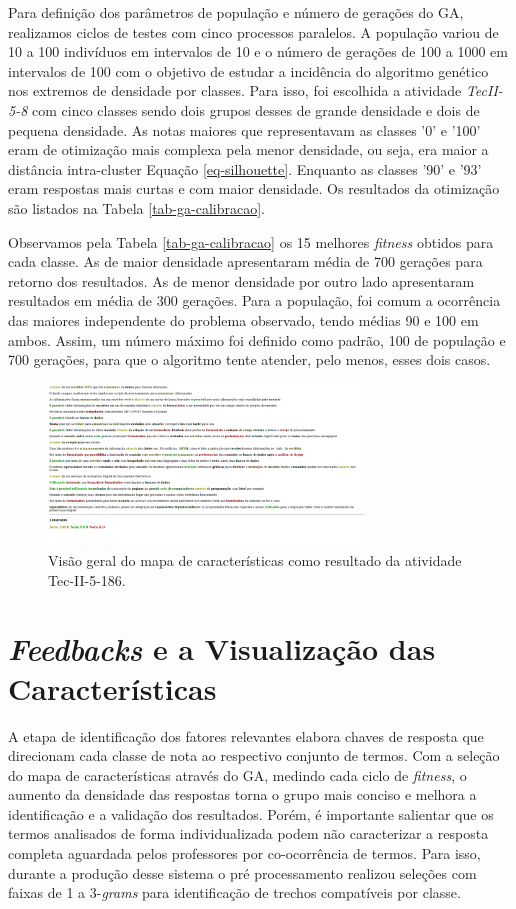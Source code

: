 Para definição dos parâmetros de população e número de gerações do GA, realizamos ciclos de testes com cinco processos paralelos. A população variou de 10 a 100 indivíduos em intervalos de 10 e o número de gerações de 100 a 1000 em intervalos de 100 com o objetivo de estudar a incidência do algoritmo genético nos extremos de densidade por classes. Para isso, foi escolhida a atividade \textit{TecII-5-8} com cinco classes sendo dois grupos desses de grande densidade e dois de pequena densidade. As notas maiores que representavam as classes '0' e '100' eram de otimização mais complexa pela menor densidade, ou seja, era maior a distância intra-cluster Equação \ref{eq-silhouette}. Enquanto as classes '90' e '93' eram respostas mais curtas e com maior densidade. Os resultados da otimização são listados na Tabela \ref{tab-ga-calibracao}.

 Observamos pela Tabela \ref{tab-ga-calibracao} os 15 melhores \textit{fitness} obtidos para cada classe. As de maior densidade apresentaram média de 700 gerações para retorno dos resultados. As de menor densidade por outro lado apresentaram resultados em média de 300 gerações. Para a população, foi comum a ocorrência das maiores independente do problema observado, tendo médias 90 e 100 em ambos. Assim, um número máximo foi definido como padrão, 100 de população e 700 gerações, para que o algoritmo tente atender, pelo menos, esses dois casos.

\begin{figure}
\centering
\includegraphics[angle=90, width=0.75\textwidth]{./img/Ufes186.png}
\caption{Visão geral do mapa de características como resultado da atividade Tec-II-5-186.}
\label{fig-ufes186}
\end{figure}

\section{{\it Feedbacks} e a Visualização das Características}

A etapa de identificação dos fatores relevantes elabora chaves de resposta que direcionam cada classe de nota ao respectivo conjunto de termos. Com a seleção do mapa de características através do GA, medindo cada ciclo de \textit{fitness}, o aumento da densidade das respostas torna o grupo mais conciso e melhora a identificação e a validação dos resultados. Porém, é importante salientar que os termos analisados de forma individualizada podem não caracterizar a resposta completa aguardada pelos professores por co-ocorrência de termos. Para isso, durante a produção desse sistema o pré processamento realizou seleções com faixas de 1 a 3-\textit{grams} para identificação de trechos compatíveis por classe.

